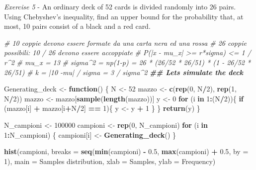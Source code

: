 \documentclass[
]{article}
\newenvironment{Shaded}{\begin{snugshade}}{\end{snugshade}}
\newcommand{\AttributeTok}[1]{\textcolor[rgb]{0.13,0.29,0.53}{#1}}
\newcommand{\CommentTok}[1]{\textcolor[rgb]{0.56,0.35,0.01}{\textit{#1}}}
\newcommand{\ControlFlowTok}[1]{\textcolor[rgb]{0.13,0.29,0.53}{\textbf{#1}}}
\newcommand{\DecValTok}[1]{\textcolor[rgb]{0.00,0.00,0.81}{#1}}
\newcommand{\DocumentationTok}[1]{\textcolor[rgb]{0.56,0.35,0.01}{\textbf{\textit{#1}}}}
\newcommand{\FloatTok}[1]{\textcolor[rgb]{0.00,0.00,0.81}{#1}}
\newcommand{\FunctionTok}[1]{\textcolor[rgb]{0.13,0.29,0.53}{\textbf{#1}}}
\newcommand{\NormalTok}[1]{#1}
\newcommand{\OtherTok}[1]{\textcolor[rgb]{0.56,0.35,0.01}{#1}}
\newcommand{\SpecialCharTok}[1]{\textcolor[rgb]{0.81,0.36,0.00}{\textbf{#1}}}
\newcommand{\StringTok}[1]{\textcolor[rgb]{0.31,0.60,0.02}{#1}}
\begin{document}
\emph{Exercise 5} - An ordinary deck of 52 cards is divided randomly
into 26 pairs. Using Chebyshev's inequality, find an upper bound for the
probability that, at most, 10 pairs consist of a black and a red card.

\begin{Shaded}
\begin{Highlighting}[]
\CommentTok{\# 10 coppie devono essere formate da una carta nera ed una rossa}
\CommentTok{\# 26 coppie possibili: 10 / 26 devono essere accoppiate }
\CommentTok{\# P(|x {-} mu\_x| \textgreater{}= r*sigma) \textless{}= 1 / r\^{}2 }
\CommentTok{\# mu\_x = 13}
\CommentTok{\# sigma\^{}2 = np(1{-}p) = 26 * (26/52 * 26/51) * (1 {-} 26/52 * 26/51)}
\CommentTok{\# k = |10 {-}mu| / sigma =  3 / sigma\^{}2 }
\DocumentationTok{\#\# Let\textquotesingle{}s simulate the deck }

\NormalTok{Generating\_deck }\OtherTok{\textless{}{-}} \ControlFlowTok{function}\NormalTok{() \{}
\NormalTok{  N }\OtherTok{\textless{}{-}} \DecValTok{52}
\NormalTok{  mazzo }\OtherTok{\textless{}{-}} \FunctionTok{c}\NormalTok{(}\FunctionTok{rep}\NormalTok{(}\DecValTok{0}\NormalTok{, N}\SpecialCharTok{/}\DecValTok{2}\NormalTok{), }\FunctionTok{rep}\NormalTok{(}\DecValTok{1}\NormalTok{, N}\SpecialCharTok{/}\DecValTok{2}\NormalTok{))}
\NormalTok{  mazzo }\OtherTok{\textless{}{-}}\NormalTok{ mazzo[}\FunctionTok{sample}\NormalTok{(}\FunctionTok{length}\NormalTok{(mazzo))]}
\NormalTok{  y }\OtherTok{\textless{}{-}} \DecValTok{0}
  \ControlFlowTok{for}\NormalTok{ (i }\ControlFlowTok{in} \DecValTok{1}\SpecialCharTok{:}\NormalTok{(N}\SpecialCharTok{/}\DecValTok{2}\NormalTok{))\{}
    \ControlFlowTok{if}\NormalTok{ (mazzo[i] }\SpecialCharTok{+}\NormalTok{ mazzo[i}\SpecialCharTok{+}\NormalTok{N}\SpecialCharTok{/}\DecValTok{2}\NormalTok{] }\SpecialCharTok{==} \DecValTok{1}\NormalTok{)\{}
\NormalTok{      y }\OtherTok{\textless{}{-}}\NormalTok{ y }\SpecialCharTok{+} \DecValTok{1}
\NormalTok{    \}}
\NormalTok{  \}}
  \FunctionTok{return}\NormalTok{(y)}
\NormalTok{\}}

\NormalTok{N\_campioni }\OtherTok{\textless{}{-}} \DecValTok{100000}
\NormalTok{campioni }\OtherTok{\textless{}{-}} \FunctionTok{rep}\NormalTok{(}\DecValTok{0}\NormalTok{, N\_campioni)}
\ControlFlowTok{for}\NormalTok{ (i }\ControlFlowTok{in} \DecValTok{1}\SpecialCharTok{:}\NormalTok{N\_campioni) \{}
\NormalTok{  campioni[i] }\OtherTok{\textless{}{-}} \FunctionTok{Generating\_deck}\NormalTok{()}
\NormalTok{\}}

\FunctionTok{hist}\NormalTok{(campioni, }\AttributeTok{breaks =} \FunctionTok{seq}\NormalTok{(}\FunctionTok{min}\NormalTok{(campioni) }\SpecialCharTok{{-}} \FloatTok{0.5}\NormalTok{, }
                            \FunctionTok{max}\NormalTok{(campioni) }\SpecialCharTok{+} \FloatTok{0.5}\NormalTok{, }\AttributeTok{by =} \DecValTok{1}\NormalTok{), }\AttributeTok{main =} \StringTok{\textquotesingle{}Samples distribution\textquotesingle{}}\NormalTok{, }\AttributeTok{xlab =} \StringTok{\textquotesingle{}Samples\textquotesingle{}}\NormalTok{, }\AttributeTok{ylab =} \StringTok{\textquotesingle{}Frequency\textquotesingle{}}\NormalTok{)}


\end{Highlighting}
\end{Shaded}
\end{document}
